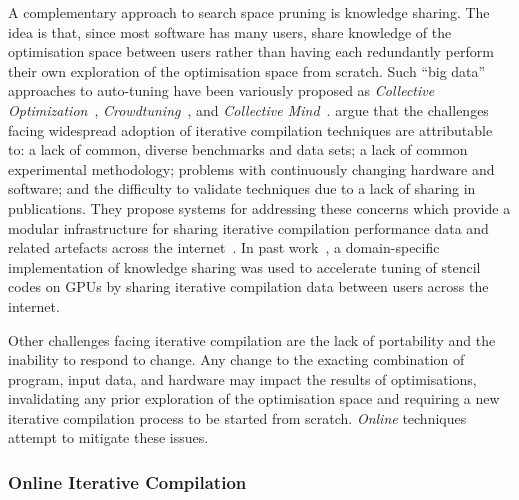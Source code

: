 A complementary approach to search space pruning is knowledge sharing. The idea is that, since most software has many users, share knowledge of the optimisation space between users rather than having each redundantly perform their own exploration of the optimisation space from scratch. Such ``big data'' approaches to auto-tuning have been variously proposed as
\emph{Collective Optimization}~\cite{Saclay2010},
\emph{Crowdtuning}~\cite{Memon2013},
and \emph{Collective Mind}~\cite{Fursin2014}.
\citeauthor{Fursin2014} argue that the challenges facing widespread adoption of iterative compilation techniques are attributable to: a lack of common, diverse benchmarks and data sets; a lack of common experimental methodology; problems with continuously changing hardware and software; and the difficulty to validate techniques due to a lack of sharing in publications. They propose systems for addressing these concerns which provide a modular infrastructure for sharing iterative compilation performance data and related artefacts across the internet~\cite{Fursin2014}.
In past work~\cite{Cummins2016}, a domain-specific implementation of knowledge sharing was used to accelerate tuning of stencil codes on GPUs by sharing iterative compilation data between users across the internet.

Other challenges facing iterative compilation are the lack of portability and the inability to respond to change. Any change to the exacting combination of program, input data, and hardware may impact the results of optimisations, invalidating any prior exploration of the optimisation space and requiring a new iterative compilation process to be started from scratch. \emph{Online} techniques attempt to mitigate these issues.


\subsubsection{Online Iterative Compilation}

